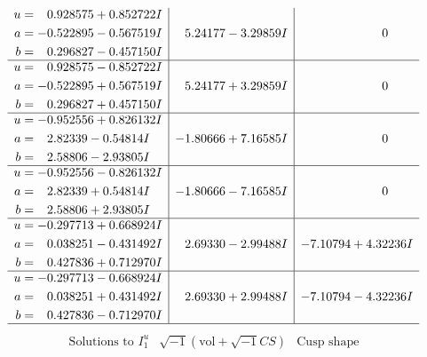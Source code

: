 \documentclass[1p]{elsarticle_modified}
\theoremstyle{definition}
\newcommand{\I}{\sqrt{-1}}
\begin{document}
$$\begin{array}{c|c|c}
\begin{aligned}
u &= \phantom{-}0.928575 + 0.852722 I \\
a &= -0.522895 - 0.567519 I \\
b &= \phantom{-}0.296827 - 0.457150 I\end{aligned}
 & \phantom{-}5.24177 - 3.29859 I & \phantom{-0.000000 } 0 \\ \hline\begin{aligned}
u &= \phantom{-}0.928575 - 0.852722 I \\
a &= -0.522895 + 0.567519 I \\
b &= \phantom{-}0.296827 + 0.457150 I\end{aligned}
 & \phantom{-}5.24177 + 3.29859 I & \phantom{-0.000000 } 0 \\ \hline\begin{aligned}
u &= -0.952556 + 0.826132 I \\
a &= \phantom{-}2.82339 - 0.54814 I \\
b &= \phantom{-}2.58806 - 2.93805 I\end{aligned}
 & -1.80666 + 7.16585 I & \phantom{-0.000000 } 0 \\ \hline\begin{aligned}
u &= -0.952556 - 0.826132 I \\
a &= \phantom{-}2.82339 + 0.54814 I \\
b &= \phantom{-}2.58806 + 2.93805 I\end{aligned}
 & -1.80666 - 7.16585 I & \phantom{-0.000000 } 0 \\ \hline\begin{aligned}
u &= -0.297713 + 0.668924 I \\
a &= \phantom{-}0.038251 - 0.431492 I \\
b &= \phantom{-}0.427836 + 0.712970 I\end{aligned}
 & \phantom{-}2.69330 - 2.99488 I & -7.10794 + 4.32236 I \\ \hline\begin{aligned}
u &= -0.297713 - 0.668924 I \\
a &= \phantom{-}0.038251 + 0.431492 I \\
b &= \phantom{-}0.427836 - 0.712970 I\end{aligned}
 & \phantom{-}2.69330 + 2.99488 I & -7.10794 - 4.32236 I\\
 \hline 
 \end{array}$$\newpage$$\begin{array}{c|c|c}  
\text{Solutions to }I^u_{1}& \I (\text{vol} + \sqrt{-1}CS) & \text{Cusp shape}\\

\end{array}$$
\end{document}
